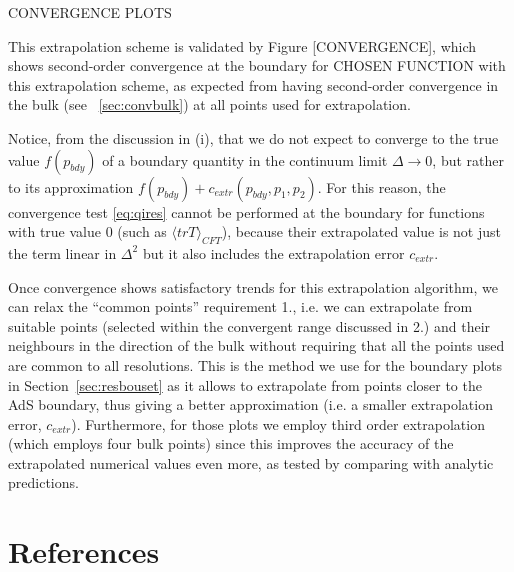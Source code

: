 \documentclass[a4paper,11pt]{article}
\numberwithin{equation}{section}
\begin{document}
CONVERGENCE PLOTS

This extrapolation scheme is validated by Figure [CONVERGENCE], which shows second-order convergence at the boundary for CHOSEN FUNCTION with this extrapolation scheme, as expected from having second-order convergence in the bulk (see ~\ref{sec:convbulk}) at all points used for extrapolation.

Notice, from the discussion in (i), that we do not expect to converge to the true value $f(p_{bdy})$ of a boundary quantity in the continuum limit $\Delta\rightarrow0$, but rather to its approximation $f(p_{bdy})+c_{extr}(p_{bdy},p_1,p_2)$.
For this reason, the convergence test \eqref{eq:qires} cannot be performed at the boundary for functions with true value 0 (such as $\langle trT \rangle_{CFT}$), because their extrapolated value is not just the term linear in $\Delta^2$ but it also includes the extrapolation error $c_{extr}$.

Once convergence shows satisfactory trends for this extrapolation algorithm, we can relax the ``common points'' requirement 1., i.e. we can extrapolate from suitable points (selected within the convergent range discussed in 2.) and their neighbours in the direction of the bulk without requiring that all the points used are common to all resolutions. %
This is the method we use for the boundary plots in Section~\ref{sec:resbouset} as it allows to extrapolate from points closer to the AdS boundary, thus giving a better approximation (i.e. a smaller extrapolation error, $c_{extr}$). Furthermore, for those plots we employ third order extrapolation (which employs four bulk points) since this improves the accuracy of the extrapolated numerical values even more, as tested by comparing with analytic predictions.

\section*{References}


\end{document}
